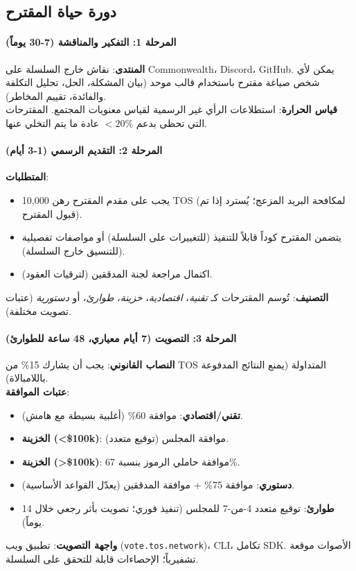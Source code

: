 \documentclass[11pt]{article}
\begin{document}
\subsection{دورة حياة المقترح}

\paragraph{المرحلة 1: التفكير والمناقشة (7-30 يوماً)}
\textbf{المنتدى}: نقاش خارج السلسلة على Commonwealth، Discord، GitHub. يمكن لأي شخص صياغة مقترح باستخدام قالب موحد (بيان المشكلة، الحل، تحليل التكلفة والفائدة، تقييم المخاطر).\\
\textbf{قياس الحرارة}: استطلاعات الرأي غير الرسمية لقياس معنويات المجتمع. المقترحات التي تحظى بدعم $<20\%$ عادة ما يتم التخلي عنها.

\paragraph{المرحلة 2: التقديم الرسمي (1-3 أيام)}
\textbf{المتطلبات}:
\begin{itemize}[noitemsep]
  \item يجب على مقدم المقترح رهن 10,000 TOS (لمكافحة البريد المزعج؛ يُسترد إذا تم قبول المقترح).
  \item يتضمن المقترح كوداً قابلاً للتنفيذ (للتغييرات على السلسلة) أو مواصفات تفصيلية (للتنسيق خارج السلسلة).
  \item اكتمال مراجعة لجنة المدققين (لترقيات العقود).
\end{itemize}
\textbf{التصنيف}: تُوسم المقترحات كـ \emph{تقنية}، \emph{اقتصادية}، \emph{خزينة}، \emph{طوارئ}، أو \emph{دستورية} (عتبات تصويت مختلفة).

\paragraph{المرحلة 3: التصويت (7 أيام معياري، 48 ساعة للطوارئ)}
\textbf{النصاب القانوني}: يجب أن يشارك 15\% من TOS المتداولة (يمنع النتائج المدفوعة باللامبالاة).\\
\textbf{عتبات الموافقة}:
\begin{itemize}[noitemsep]
  \item \textbf{تقني/اقتصادي}: موافقة 60\% (أغلبية بسيطة مع هامش).
  \item \textbf{الخزينة (<\$100k)}: موافقة المجلس (توقيع متعدد).
  \item \textbf{الخزينة (>\$100k)}: موافقة حاملي الرموز بنسبة 67\%.
  \item \textbf{دستوري}: موافقة 75\% + موافقة المدققين (يعدّل القواعد الأساسية).
  \item \textbf{طوارئ}: توقيع متعدد 4-من-7 للمجلس (تنفيذ فوري؛ تصويت بأثر رجعي خلال 14 يوماً).
\end{itemize}
\textbf{واجهة التصويت}: تطبيق ويب (\texttt{vote.tos.network})، CLI، تكامل SDK. الأصوات موقعة تشفيرياً؛ الإحصاءات قابلة للتحقق على السلسلة.
\end{document}
